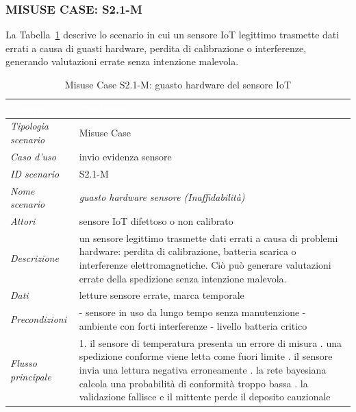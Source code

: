 \subsubsection*{MISUSE CASE: S2.1-M}
La Tabella~\ref{tab:s21m} descrive lo scenario in cui un sensore IoT legittimo trasmette dati errati a causa di guasti hardware, perdita di calibrazione o interferenze, generando valutazioni errate senza intenzione malevola.
\begin{longtable}{| >{\columncolor{misuseCol}}p{} | p{} |}
\caption{Misuse Case S2.1-M: guasto hardware del sensore IoT}\label{tab:s21m}\\
\hline
\rowcolor{misuseHeader} \textcolor{white}{\textit{Campo}} & \textcolor{white}{\textit{Contenuto}} \\
\hline
\textit{Tipologia scenario} & Misuse Case \\
\hline
\textit{Caso d'uso} & invio evidenza sensore \\
\hline
\textit{ID scenario} & S2.1-M \\
\hline
\textit{Nome scenario} & \textit{guasto hardware sensore (Inaffidabilità)} \\
\hline
\textit{Attori} & sensore IoT difettoso o non calibrato \\
\hline
\textit{Descrizione} & un sensore legittimo trasmette dati errati a causa di problemi hardware: perdita di calibrazione, batteria scarica o interferenze elettromagnetiche. Ciò può generare valutazioni errate della spedizione senza intenzione malevola. \\
\hline
\textit{Dati} & letture sensore errate, marca temporale \\
\hline
\textit{Precondizioni} & - sensore in uso da lungo tempo senza manutenzione \newline - ambiente con forti interferenze \newline - livello batteria critico \\
\hline
\textit{Flusso principale} & 1. il sensore di temperatura presenta un errore di misura \newline 2. una spedizione conforme viene letta come fuori limite \newline 3. il sensore invia una lettura negativa erroneamente \newline 4. la rete bayesiana calcola una probabilità di conformità troppo bassa \newline 5. la validazione fallisce e il mittente perde il deposito cauzionale \\
\hline

\end{longtable}
